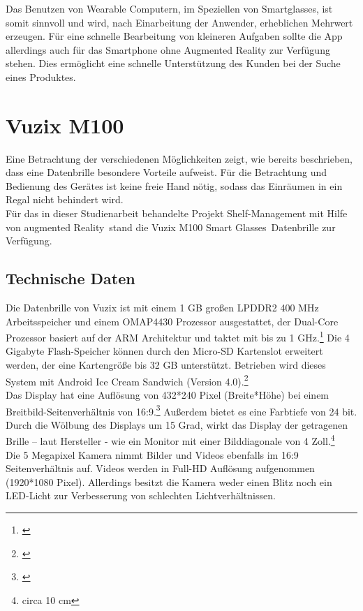 Das Benutzen von Wearable Computern, im Speziellen von Smartglasses, ist somit sinnvoll und wird, nach Einarbeitung der Anwender, erheblichen Mehrwert erzeugen. Für eine schnelle Bearbeitung von kleineren Aufgaben sollte die App allerdings auch für das Smartphone ohne Augmented Reality zur Verfügung stehen. Dies ermöglicht \zB eine schnelle Unterstützung des Kunden bei der Suche eines Produktes.

\section{Vuzix M100}
\label{sec:vuzix}
Eine Betrachtung der verschiedenen Möglichkeiten zeigt, wie bereits beschrieben, dass eine Datenbrille besondere Vorteile aufweist. Für die Betrachtung und Bedienung des Gerätes ist keine freie Hand nötig, sodass das Einräumen in ein Regal nicht behindert wird.\\

Für das in dieser Studienarbeit behandelte Projekt \glqq Shelf-Management mit Hilfe von augmented Reality\grqq\ stand die \glqq Vuzix M100 Smart Glasses\grqq\ Datenbrille zur Verfügung.

\subsection{Technische Daten}
Die Datenbrille von Vuzix ist mit einem 1 \ac{GB} großen LPDDR2 400 \ac{MHz} Arbeitsspeicher und einem OMAP4430 Prozessor ausgestattet, der Dual-Core Prozessor basiert auf der \ac{ARM} Architektur und taktet mit bis zu 1 \ac{GHz}.\footnote{\citep{omap4430}} Die 4 Gigabyte Flash-Speicher können durch den Micro-\acs{SD} Kartenslot erweitert werden, der eine Kartengröße bis 32 \ac{GB} unterstützt. Betrieben wird dieses System mit Android Ice Cream Sandwich (Version 4.0).\footnote{\citep{vuzixm100}}\\

Das Display hat eine Auflösung von 432*240 Pixel (Breite*Höhe) bei einem Breitbild-Seitenverhältnis von 16:9.\footnote{\citep{wqvga}} Außerdem bietet es eine Farbtiefe von 24 bit. Durch die Wölbung des Displays um 15 Grad, wirkt das Display der getragenen Brille – laut Hersteller - wie ein Monitor mit einer Bilddiagonale von 4 Zoll.\footnote{circa 10 \ac{cm}}\\

Die 5 Megapixel Kamera nimmt Bilder und Videos ebenfalls im 16:9 Seitenverhältnis auf. Videos werden in Full-HD Auflösung aufgenommen (1920*1080 Pixel). Allerdings besitzt die Kamera weder einen Blitz noch ein LED-Licht zur Verbesserung von schlechten Lichtverhältnissen.\\

